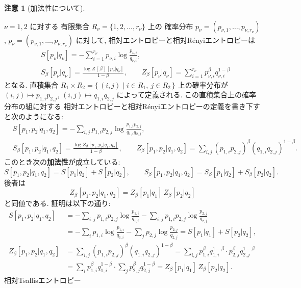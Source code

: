 \documentclass[12pt,twoside]{jarticle}
\theoremstyle{definition} %
\theoremstyle{definition} %
\theoremstyle{definition} %
\newtheorem{remark}[theorem]{注意}
\numberwithin{theorem}{section}
\numberwithin{equation}{section}
\numberwithin{figure}{section}
\numberwithin{table}{section}
\begin{document}
\begin{remark}[加法性について]
\label{remark:additivity}

$\nu=1,2$ に対する
有限集合 $R_\nu=\{1,2,\ldots,r_\nu\}$ 上の
確率分布 $p_\nu=(p_{\nu,1},\ldots,p_{\nu,r_\nu})$, 
$p_\nu=(p_{\nu,1},\ldots,p_{\nu,r_\nu})$ に対して,
相対エントロピーと相対R\'enyiエントロピーは
\begin{align*}
&
S[p_\nu|q_\nu] = -\sum_{i=1}^{r_\nu} p_{\nu,i}\log\frac{p_{\nu,i}}{q_{\nu,i}},
\\ &
S_\beta[p_\nu|q_\nu] = \frac{\log Z(\beta)[p_\nu|q_\nu]}{1-\beta},
\qquad
Z_\beta[p_\nu|q_\nu] = \sum_{i=1}^{r_\nu} p_{\nu,i}^\beta q_{\nu,i}^{1-\beta}
\end{align*}
となる. 
直積集合 $R_1\times R_2=\{\,(i,j)\mid i\in R_1,\ j\in R_2\,\}$ 上の確率分布が
$(i,j)\mapsto p_{1,i}p_{2,j}$,  
$(i,j)\mapsto q_{1,i}q_{2,j}$
によって定義される. この直積集合上の確率分布の組に対する
相対エントロピーと相対R\'enyiエントロピーの定義を書き下すと次のようになる:
\begin{align*}
&
S[p_1,p_2|q_1,q_2] 
= -\sum_{i,j} p_{1,i}p_{2,j}\log\frac{p_{1,i}p_{2,j}}{q_{1,i}q_{2,j}},
\\ &
S_\beta[p_1,p_2|q_1,q_2] = \frac{\log Z_\beta[p_1,p_2|q_1,q_2]}{1-\beta},
\qquad
Z_\beta[p_1,p_2|q_1,q_2] = \sum_{i,j} (p_{1,i}p_{2,j})^\beta (q_{1,i}q_{2,j})^{1-\beta}.
\end{align*}
このとき次の{\bf 加法性}が成立している:
\[
S[p_1,p_2|q_1,q_2] = S[p_1|q_2] + S[p_2|q_2], \qquad
S_\beta[p_1,p_2|q_1,q_2] = S_\beta[p_1|q_2] + S_\beta[p_2|q_2].
\]
後者は
\[
Z_\beta[p_1,p_2|q_1,q_2]
= Z_\beta[p_1|q_1]\, Z_\beta[p_2|q_2]
\]
と同値である. 証明は以下の通り:
\begin{align*}
S[p_1,p_2|q_1,q_2]
&
=
-\sum_{i,j}p_{1,i}p_{2,j}\log\frac{p_{1,i}}{q_{1,i}}
-\sum_{i,j}p_{1,i}p_{2,j}\log\frac{p_{2,j}}{q_{2,j}}
\\ &
=
-\sum_{i}p_{1,i}\log\frac{p_{1,i}}{q_{1,i}}
-\sum_{j}p_{2,j}\log\frac{p_{2,j}}{q_{2,j}}
= S[p_1|q_1] + S[p_2|q_2],
\\
Z_\beta[p_1,p_2|q_1,q_2]
&
= \sum_{i,j} (p_{1,i}p_{2,j})^\beta (q_{1,i}q_{2,j})^{1-\beta}
= \sum_{i,j} p_{1,i}^\beta q_{1,i}^{1-\beta}\cdot p_{2,j}^\beta q_{2,j}^{1-\beta}
\\ &
= \sum_i p_{1,i}^\beta q_{1,i}^{1-\beta}\cdot \sum_j p_{2,j}^\beta q_{2,j}^{1-\beta}
= Z_\beta[p_1|q_1]\, Z_\beta[p_2|q_2].
\end{align*}
相対Tsallisエントロピー
\begin{align*}

\end{align*}
\end{remark}
\end{document}
